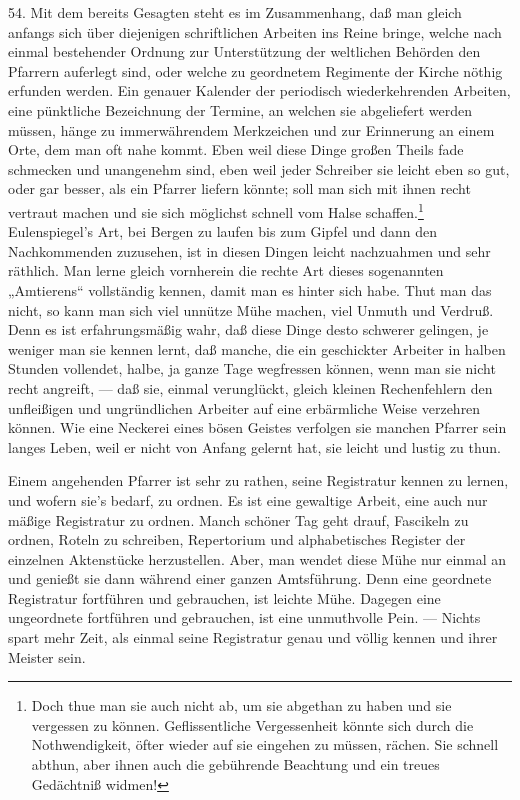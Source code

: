 54. Mit dem bereits Gesagten steht es im Zusammenhang, daß man gleich anfangs sich über diejenigen schriftlichen Arbeiten ins Reine bringe, welche nach einmal bestehender Ordnung zur Unterstützung der weltlichen Behörden den Pfarrern auferlegt sind, oder welche zu geordnetem Regimente der Kirche nöthig erfunden werden. Ein genauer Kalender der periodisch wiederkehrenden Arbeiten, eine pünktliche Bezeichnung der Termine, an welchen sie abgeliefert werden müssen, hänge zu immerwährendem Merkzeichen und zur Erinnerung an einem Orte, dem man oft nahe kommt. Eben weil diese Dinge großen Theils fade schmecken und unangenehm sind, eben weil jeder Schreiber sie leicht eben so gut, oder gar besser, als ein Pfarrer liefern könnte; soll man sich mit ihnen recht vertraut machen und sie sich möglichst schnell vom Halse schaffen.\footnote{Doch thue man sie auch nicht ab, um sie abgethan zu haben und sie vergessen zu können. Geflissentliche Vergessenheit könnte sich durch die Nothwendigkeit, öfter wieder auf sie eingehen zu müssen, rächen. Sie schnell abthun, aber ihnen auch die gebührende Beachtung und ein treues Gedächtniß widmen!} Eulenspiegel’s Art, bei Bergen zu laufen bis zum Gipfel und dann den Nachkommenden zuzusehen, ist in diesen Dingen leicht nachzuahmen und sehr räthlich. Man lerne gleich vornherein
die rechte Art dieses sogenannten „Amtierens“ vollständig kennen, damit man es hinter sich habe. Thut man das nicht, so kann man sich viel unnütze Mühe machen, viel Unmuth und Verdruß. Denn es ist erfahrungsmäßig wahr, daß diese Dinge desto schwerer gelingen, je weniger man sie kennen lernt, daß manche, die ein geschickter Arbeiter in halben Stunden vollendet, halbe, ja ganze Tage wegfressen können, wenn man sie nicht recht angreift, — daß sie, einmal verunglückt, gleich kleinen Rechenfehlern den unfleißigen und ungründlichen Arbeiter auf eine erbärmliche Weise verzehren können. Wie eine Neckerei eines bösen Geistes verfolgen sie manchen Pfarrer sein langes Leben, weil er nicht von Anfang gelernt hat, sie leicht und lustig zu thun.

Einem angehenden Pfarrer ist sehr zu rathen, seine Registratur kennen zu lernen, und wofern sie’s bedarf, zu ordnen. Es ist eine gewaltige Arbeit, eine auch nur mäßige Registratur zu ordnen. Manch schöner Tag geht drauf, Fascikeln zu ordnen, Roteln zu schreiben, Repertorium und alphabetisches Register der einzelnen Aktenstücke herzustellen. Aber, man wendet diese Mühe nur einmal an und genießt sie dann während einer ganzen Amtsführung. Denn eine geordnete Registratur fortführen und gebrauchen, ist leichte Mühe. Dagegen eine ungeordnete fortführen und gebrauchen, ist eine unmuthvolle Pein. — Nichts spart mehr Zeit, als einmal seine Registratur genau und völlig kennen und ihrer Meister sein.

